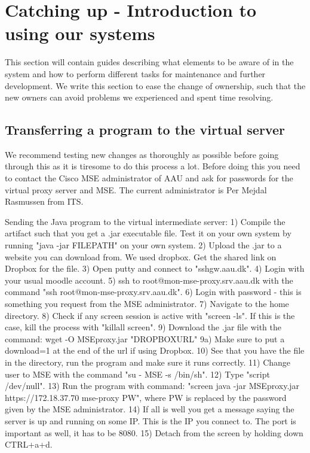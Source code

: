\section{Catching up - Introduction to using our systems}
This section will contain guides describing what elements to be aware of in the system and how to perform different tasks for maintenance and further development. We write this section to ease the change of ownership, such that the new owners can avoid problems we experienced and spent time resolving. 

\subsection*{Transferring a program to the virtual server}
We recommend testing new changes as thoroughly as possible before going through this as it is tiresome to do this process a lot. Before doing this you need to contact the Cisco MSE administrator of AAU and ask for passwords for the virtual proxy server and MSE. The current administrator is Per Mejdal Rasmussen from ITS.

Sending the Java program to the virtual intermediate server:
1) Compile the artifact such that you get a .jar executable file. Test it on your own system by running "java -jar FILEPATH" on your own system.
2) Upload the .jar to a website you can download from. We used dropbox. Get the shared link on Dropbox for the file.
3) Open putty and connect to "sshgw.aau.dk".
4) Login with your usual moodle account.
5) ssh to root@mon-mse-proxy.srv.aau.dk with the command "ssh root@mon-mse-proxy.srv.aau.dk".
6) Login with password - this is something you request from the MSE administrator.
7) Navigate to the home directory.
8) Check if any screen session is active with "screen -ls". If this is the case, kill the process with "killall screen".
9) Download the .jar file with the command: wget -O MSEproxy.jar "DROPBOXURL" 
9a) Make sure to put a download=1 at the end of the url if using Dropbox.
10) See that you have the file in the directory, run the program and make sure it runs correctly.
11) Change user to MSE with the command "su - MSE -s /bin/sh".
12) Type "script /dev/null".
13) Run the program with command: "screen java -jar MSEproxy.jar https://172.18.37.70 mse-proxy PW", where PW is replaced by the password given by the MSE administrator.
14) If all is well you get a message saying the server is up and running on some IP. This is the IP you connect to. The port is important as well, it has to be 8080.
15) Detach from the screen by holding down CTRL+a+d.

